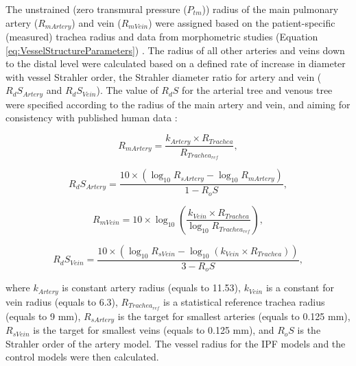 The unstrained (zero transmural pressure ($P_{tm}$)) radius of the main pulmonary artery ($R_{mArtery}$) and vein ($R_{mVein}$) were assigned based on the patient-specific (measured) trachea radius and data from morphometric studies (Equation \ref{eq:VesselStructureParameters}) \citep{horsfield1978morphometry,horsfield1981morphometry,huang1996morphometry}. The radius of all other arteries and veins down to the distal level were calculated based on a defined rate of increase in diameter with vessel Strahler order, the Strahler diameter ratio for artery and vein ($R_dS_{Artery}$ and $R_dS_{Vein}$). The value of $R_dS$ for the arterial tree and venous tree were specified according to the radius of the main artery and vein, and aiming for consistency with published human data \citep{horsfield1971models, horsfield1978morphometry,horsfield1981morphometry,huang1996morphometry}:

\begin{equation} 
 \label{eq:MainArteryRadius}
 R_{mArtery} = \frac{k_{Artery} \times R_{Trachea}}{{R_{Trachea_{ref}}}},
\end{equation}

\begin{equation} 
 \label{eq:ArteryStrahlerDiameterRatio}
 R_dS_{Artery} = \frac{10 \times (\log_{10}R_{sArtery} - \log_{10}R_{mArtery})}{1-R_oS},
\end{equation}

\begin{equation} 
 \label{eq:MainVeinRadius}
 R_{mVein} = 10 \times \log_{10}(\frac{k_{Vein} \times R_{Trachea}}{\log_{10}R_{Trachea_{ref}}}),
\end{equation}

\begin{equation} 
 \label{eq:VeinStrahlerDiameterRatio}
 R_dS_{Vein} = \frac{10 \times (\log_{10}R_{sVein} - \log_{10}(k_{Vein} \times R_{Trachea}))}{3 - R_oS},
\end{equation}

\noindent where $k_{Artery}$ is constant artery radius (equals to 11.53), $k_{Vein}$ is a constant for vein radius (equals to 6.3), $R_{Trachea_{ref}}$ is a statistical reference trachea radius (equals to 9 mm), $R_{sArtery}$ is the target for smallest arteries (equals to 0.125 mm), $R_{sVein}$ is the target for smallest veins (equals to 0.125 mm), and $R_oS$ is the Strahler order of the artery model. The vessel radius for the IPF models and the control models were then calculated. 
 
